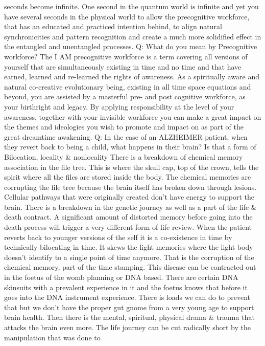 seconds become infinite. One second in the quantum world is infinite and
yet you have several seconds in the physical world to allow the
precognitive workforce, that has an educated and practiced intention
behind, to align natural synchronicities and pattern recognition and
create a much more solidified effect in the entangled and unentangled
processes. Q: What do you mean by Precognitive workforce? The I AM
precognitive workforce is a term covering all versions of yourself that
are simultaneously existing in time and no time and that have earned,
learned and re-learned the rights of awareness. As a spiritually aware
and natural co-creative evolutionary being, existing in all time space
equations and beyond, you are assisted by a masterful pre- and post
cognitive workforce, as your birthright and legacy. By applying
responsibility at the level of your awareness, together with your
invisible workforce you can make a great impact on the themes and
ideologies you wish to promote and impact on as part of the great
dreamtime awakening. Q: In the case of an ALZHEIMER patient, when they
revert back to being a child, what happens in their brain? Is that a
form of Bilocation, locality \& nonlocality There is a breakdown of
chemical memory association in the file tree. This is where the skull
cap, top of the crown, tells the spirit where all the files are stored
inside the body. The chemical memories are corrupting the file tree
because the brain itself has broken down through lesions. Cellular
pathways that were originally created don't have energy to support the
brain. There is a breakdown in the genetic journey as well as a part of
the life \& death contract. A significant amount of distorted memory
before going into the death process will trigger a very different form
of life review. When the patient reverts back to younger versions of the
self it is a co-existence in time by technically bilocating in time. It
skews the light memories where the light body doesn't identify to a
single point of time anymore. That is the corruption of the chemical
memory, part of the time stamping. This disease can be contracted out in
the foetus of the womb planning or DNA based. There are certain DNA
skinsuits with a prevalent experience in it and the foetus knows that
before it goes into the DNA instrument experience. There is loads we can
do to prevent that but we don't have the proper gut gnome from a very
young age to support brain health. Then there is the mental, spiritual,
physical drama \& trauma that attacks the brain even more. The life
journey can be cut radically short by the manipulation that was done to

